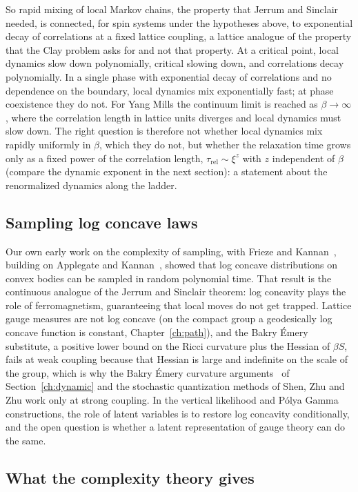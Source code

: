 So rapid mixing of local Markov chains, the property that Jerrum and Sinclair needed, is connected, for spin systems under the hypotheses above, to exponential decay of correlations at a fixed lattice coupling, a lattice analogue of the property that the Clay problem asks for and not that property. At a critical point, local dynamics slow down polynomially, critical slowing down, and correlations decay polynomially. In a single phase with exponential decay of correlations and no dependence on the boundary, local dynamics mix exponentially fast; at phase coexistence they do not. For Yang Mills the continuum limit is reached as $\beta\to\infty$, where the correlation length in lattice units diverges and local dynamics must slow down. The right question is therefore not whether local dynamics mix rapidly uniformly in $\beta$, which they do not, but whether the relaxation time grows only as a fixed power of the correlation length, $\tau_{\mathrm{rel}}\sim\xi^z$ with $z$ independent of $\beta$ (compare the dynamic exponent in the next section): a statement about the renormalized dynamics along the ladder.

\subsection{Sampling log concave laws}

Our own early work on the complexity of sampling, with Frieze and Kannan~\cite{FKP}, building on Applegate and Kannan~\cite{AK91}, showed that log concave distributions on convex bodies can be sampled in random polynomial time. That result is the continuous analogue of the Jerrum and Sinclair theorem: log concavity plays the role of ferromagnetism, guaranteeing that local moves do not get trapped. Lattice gauge measures are not log concave (on the compact group a geodesically log concave function is constant, Chapter~\ref{ch:path}), and the Bakry \'Emery substitute, a positive lower bound on the Ricci curvature plus the Hessian of $\beta S$, fails at weak coupling because that Hessian is large and indefinite on the scale of the group, which is why the Bakry \'Emery curvature arguments~\cite{BE} of Section~\ref{ch:dynamic} and the stochastic quantization methods of Shen, Zhu and Zhu work only at strong coupling. In the vertical likelihood and P\'olya Gamma constructions, the role of latent variables is to restore log concavity conditionally, and the open question is whether a latent representation of gauge theory can do the same.

\subsection{What the complexity theory gives}

